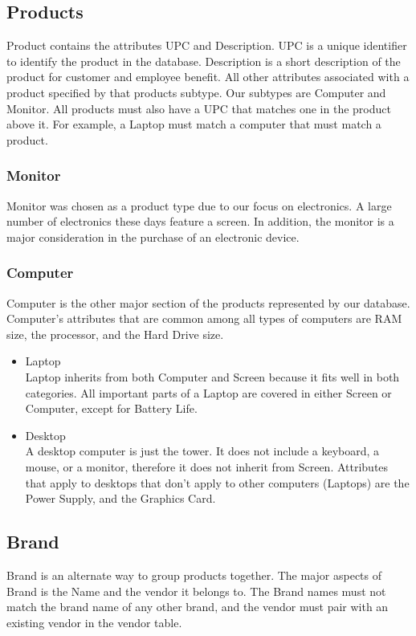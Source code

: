 \documentclass{article}
\begin{document}
		\subsection{Products}
      Product contains the attributes UPC and Description. UPC is a unique identifier to
      identify the product in the database. Description is a short description of the product
      for customer and employee benefit. All other attributes associated with a product
      specified by that products subtype.  Our subtypes are Computer and Monitor. All products
      must also have a UPC that matches one in the product above it. For example, a Laptop must
      match a computer that must match a product.

			\subsubsection{Monitor}
				Monitor was chosen as a product type due to our focus on electronics.  A
				large number of electronics these days feature a screen. In addition, the
				monitor is a major consideration in the purchase of an electronic device.

			\subsubsection{Computer}
        Computer is the other major section of the products represented by our database.
        Computer's attributes that are common among all types of computers are RAM size, the
        processor, and the Hard Drive size. 
				\begin{itemize}
          \item Laptop\\
            Laptop inherits from both Computer and Screen because it fits well in both
            categories. All important parts of a Laptop are covered in either Screen or
            Computer, except for Battery Life.
					\item Desktop\\
            A desktop computer is just the tower. It does not include a keyboard, a mouse, or a
            monitor, therefore it does not inherit from Screen. Attributes that apply to
            desktops that don't apply to other computers (Laptops) are the Power Supply, and
            the Graphics Card.
				\end{itemize}

		\subsection{Brand}
			Brand is an alternate way to group products together. The major aspects of
			Brand is the Name and the vendor it belongs to. The Brand names must not 
			match the brand name of any other brand, and the vendor must pair with 
			an existing vendor in the vendor table. 
\end{document}
